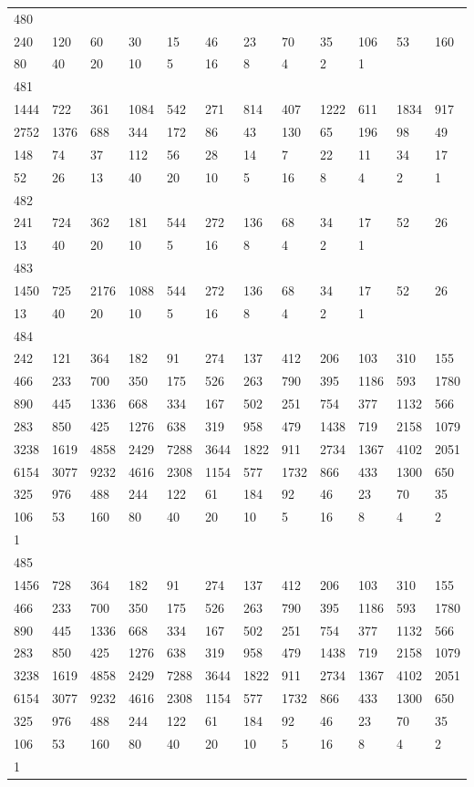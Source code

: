 \begin{longtable}{llllllllllll}
480&&&&&&&&&&&\\
240& 120& 60& 30& 15& 46& 23& 70& 35& 106& 53& 160\\
80& 40& 20& 10& 5& 16& 8& 4& 2& 1& \\

481&&&&&&&&&&&\\
1444& 722& 361& 1084& 542& 271& 814& 407& 1222& 611& 1834& 917\\
2752& 1376& 688& 344& 172& 86& 43& 130& 65& 196& 98& 49\\
148& 74& 37& 112& 56& 28& 14& 7& 22& 11& 34& 17\\
52& 26& 13& 40& 20& 10& 5& 16& 8& 4& 2& 1\\

482&&&&&&&&&&&\\
241& 724& 362& 181& 544& 272& 136& 68& 34& 17& 52& 26\\
13& 40& 20& 10& 5& 16& 8& 4& 2& 1& \\

483&&&&&&&&&&&\\
1450& 725& 2176& 1088& 544& 272& 136& 68& 34& 17& 52& 26\\
13& 40& 20& 10& 5& 16& 8& 4& 2& 1& \\

484&&&&&&&&&&&\\
242& 121& 364& 182& 91& 274& 137& 412& 206& 103& 310& 155\\
466& 233& 700& 350& 175& 526& 263& 790& 395& 1186& 593& 1780\\
890& 445& 1336& 668& 334& 167& 502& 251& 754& 377& 1132& 566\\
283& 850& 425& 1276& 638& 319& 958& 479& 1438& 719& 2158& 1079\\
3238& 1619& 4858& 2429& 7288& 3644& 1822& 911& 2734& 1367& 4102& 2051\\
6154& 3077& 9232& 4616& 2308& 1154& 577& 1732& 866& 433& 1300& 650\\
325& 976& 488& 244& 122& 61& 184& 92& 46& 23& 70& 35\\
106& 53& 160& 80& 40& 20& 10& 5& 16& 8& 4& 2\\
1& \\

485&&&&&&&&&&&\\
1456& 728& 364& 182& 91& 274& 137& 412& 206& 103& 310& 155\\
466& 233& 700& 350& 175& 526& 263& 790& 395& 1186& 593& 1780\\
890& 445& 1336& 668& 334& 167& 502& 251& 754& 377& 1132& 566\\
283& 850& 425& 1276& 638& 319& 958& 479& 1438& 719& 2158& 1079\\
3238& 1619& 4858& 2429& 7288& 3644& 1822& 911& 2734& 1367& 4102& 2051\\
6154& 3077& 9232& 4616& 2308& 1154& 577& 1732& 866& 433& 1300& 650\\
325& 976& 488& 244& 122& 61& 184& 92& 46& 23& 70& 35\\
106& 53& 160& 80& 40& 20& 10& 5& 16& 8& 4& 2\\
1& \\


\end{longtable}
